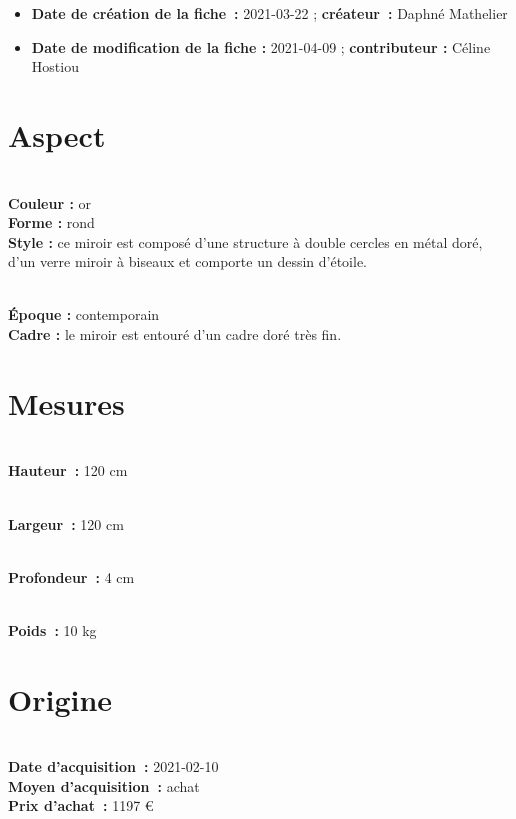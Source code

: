  
    
    
    \begin {itemize}
     
    \item {\bf \large Date de création de la fiche :} 2021-03-22 ; 
    {\bf \large créateur :} Daphné Mathelier 
    \item {\bf \large Date de modification de la fiche :} 2021-04-09 ; 
    {\bf \large contributeur :} Céline Hostiou
    \end {itemize}
   
     \section* {Aspect}
     \\ {\bf \large Couleur :} or
     \\ {\bf \large Forme :}  rond 
      \\ {\bf \large Style :} 
            ce miroir est composé d’une structure à double cercles en métal
                doré, d’un verre miroir à biseaux et comporte un dessin d’étoile.
        
        \\ {\bf \large Époque :} contemporain
      \\ {\bf \large Cadre :} 
            le miroir est entouré d’un cadre doré très fin.
         
    \section* {Mesures}
       
    \\ {\bf \large Hauteur :}
      120 cm
    
    \\ {\bf \large Largeur :}
      120 cm
     
    \\ {\bf \large Profondeur :}
      4 cm
    
    \\ {\bf \large Poids :}
      10 kg
     
    \section* {Origine}
    \\ {\bf \large Date d’acquisition :} 2021-02-10
    \\ {\bf \large Moyen d’acquisition :} achat
          \\ {\bf \large Prix d’achat :} 1197 €
        
